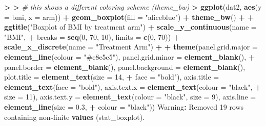 \documentclass[
]{book}
\newenvironment{Shaded}{\begin{snugshade}}{\end{snugshade}}
\newcommand{\CommentTok}[1]{\textcolor[rgb]{0.56,0.35,0.01}{\textit{#1}}}
\newcommand{\DataTypeTok}[1]{\textcolor[rgb]{0.13,0.29,0.53}{#1}}
\newcommand{\DecValTok}[1]{\textcolor[rgb]{0.00,0.00,0.81}{#1}}
\newcommand{\ErrorTok}[1]{\textcolor[rgb]{0.64,0.00,0.00}{\textbf{#1}}}
\newcommand{\FloatTok}[1]{\textcolor[rgb]{0.00,0.00,0.81}{#1}}
\newcommand{\KeywordTok}[1]{\textcolor[rgb]{0.13,0.29,0.53}{\textbf{#1}}}
\newcommand{\NormalTok}[1]{#1}
\newcommand{\OperatorTok}[1]{\textcolor[rgb]{0.81,0.36,0.00}{\textbf{#1}}}
\newcommand{\StringTok}[1]{\textcolor[rgb]{0.31,0.60,0.02}{#1}}
\begin{document}
\begin{Shaded}
\begin{Highlighting}[]
\OperatorTok{>}\StringTok{ }
\ErrorTok{>}\StringTok{ }\CommentTok{# this shows a different coloring scheme (theme_bw)}
\ErrorTok{>}\StringTok{ }\KeywordTok{ggplot}\NormalTok{(dat2, }\KeywordTok{aes}\NormalTok{(}\DataTypeTok{y =}\NormalTok{ bmi, }\DataTypeTok{x =}\NormalTok{ arm)) }\OperatorTok{+}\StringTok{ }\KeywordTok{geom_boxplot}\NormalTok{(}\DataTypeTok{fill =} \StringTok{"aliceblue"}\NormalTok{) }\OperatorTok{+}\StringTok{ }\KeywordTok{theme_bw}\NormalTok{() }\OperatorTok{+}\StringTok{ }
\OperatorTok{+}\StringTok{     }\KeywordTok{ggtitle}\NormalTok{(}\StringTok{"Boxplot of BMI by treatment arm"}\NormalTok{) }\OperatorTok{+}\StringTok{ }\KeywordTok{scale_y_continuous}\NormalTok{(}\DataTypeTok{name =} \StringTok{"BMI"}\NormalTok{, }
\OperatorTok{+}\StringTok{     }\DataTypeTok{breaks =} \KeywordTok{seq}\NormalTok{(}\DecValTok{0}\NormalTok{, }\DecValTok{70}\NormalTok{, }\DecValTok{10}\NormalTok{), }\DataTypeTok{limits =} \KeywordTok{c}\NormalTok{(}\DecValTok{0}\NormalTok{, }\DecValTok{70}\NormalTok{)) }\OperatorTok{+}\StringTok{ }\KeywordTok{scale_x_discrete}\NormalTok{(}\DataTypeTok{name =} \StringTok{"Treatment Arm"}\NormalTok{) }\OperatorTok{+}\StringTok{ }
\OperatorTok{+}\StringTok{     }\KeywordTok{theme}\NormalTok{(}\DataTypeTok{panel.grid.major =} \KeywordTok{element_line}\NormalTok{(}\DataTypeTok{colour =} \StringTok{"#e8e5e5"}\NormalTok{), }\DataTypeTok{panel.grid.minor =} \KeywordTok{element_blank}\NormalTok{(), }
\OperatorTok{+}\StringTok{         }\DataTypeTok{panel.border =} \KeywordTok{element_blank}\NormalTok{(), }\DataTypeTok{panel.background =} \KeywordTok{element_blank}\NormalTok{(), }\DataTypeTok{plot.title =} \KeywordTok{element_text}\NormalTok{(}\DataTypeTok{size =} \DecValTok{14}\NormalTok{, }
\OperatorTok{+}\StringTok{             }\DataTypeTok{face =} \StringTok{"bold"}\NormalTok{), }\DataTypeTok{axis.title =} \KeywordTok{element_text}\NormalTok{(}\DataTypeTok{face =} \StringTok{"bold"}\NormalTok{), }\DataTypeTok{axis.text.x =} \KeywordTok{element_text}\NormalTok{(}\DataTypeTok{colour =} \StringTok{"black"}\NormalTok{, }
\OperatorTok{+}\StringTok{             }\DataTypeTok{size =} \DecValTok{11}\NormalTok{), }\DataTypeTok{axis.text.y =} \KeywordTok{element_text}\NormalTok{(}\DataTypeTok{colour =} \StringTok{"black"}\NormalTok{, }\DataTypeTok{size =} \DecValTok{9}\NormalTok{), }\DataTypeTok{axis.line =} \KeywordTok{element_line}\NormalTok{(}\DataTypeTok{size =} \FloatTok{0.3}\NormalTok{, }
\OperatorTok{+}\StringTok{             }\DataTypeTok{colour =} \StringTok{"black"}\NormalTok{))}
\NormalTok{Warning}\OperatorTok{:}\StringTok{ }\NormalTok{Removed }\DecValTok{19}\NormalTok{ rows containing non}\OperatorTok{-}\NormalTok{finite }\KeywordTok{values}\NormalTok{ (stat_boxplot).}
\end{Highlighting}
\end{Shaded}
\end{document}
